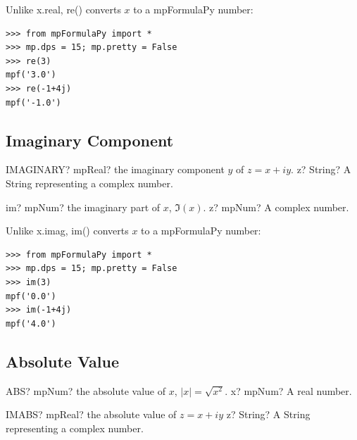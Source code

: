 \vpara
Unlike x.real, re() converts $x$ to a mpFormulaPy number:

\begin{lstlisting}
>>> from mpFormulaPy import *
>>> mp.dps = 15; mp.pretty = False
>>> re(3)
mpf('3.0')
>>> re(-1+4j)
mpf('-1.0')
\end{lstlisting}


\subsection{Imaginary Component}

\begin{mpFunctionsExtract}
	\mpWorksheetFunctionOneNotImplemented
	{IMAGINARY? mpReal? the imaginary component $y$ of $z=x+iy$.}
	{z? String? A String representing a complex number.}
\end{mpFunctionsExtract}

\vspace{0.6cm}

\begin{mpFunctionsExtract}
	\mpFunctionOne
	{im? mpNum? the imaginary part of $x$, $\Im(x)$.}
	{z? mpNum? A complex number.}
\end{mpFunctionsExtract}

Unlike x.imag, im() converts  $x$ to a mpFormulaPy number:

\begin{lstlisting}
>>> from mpFormulaPy import *
>>> mp.dps = 15; mp.pretty = False
>>> im(3)
mpf('0.0')
>>> im(-1+4j)
mpf('4.0')
\end{lstlisting}



\subsection{Absolute Value}

\begin{mpFunctionsExtract}
	\mpWorksheetFunctionOneNotImplemented
	{ABS? mpNum? the absolute value of $x$, $|x| = \sqrt{x^2}$.}
	{x? mpNum? A real number.}
\end{mpFunctionsExtract}


\vspace{0.6cm}

\begin{mpFunctionsExtract}
	\mpWorksheetFunctionOneNotImplemented
	{IMABS? mpReal? the absolute value of $z=x+iy$}
	{z? String? A String representing a complex number.}
\end{mpFunctionsExtract}

